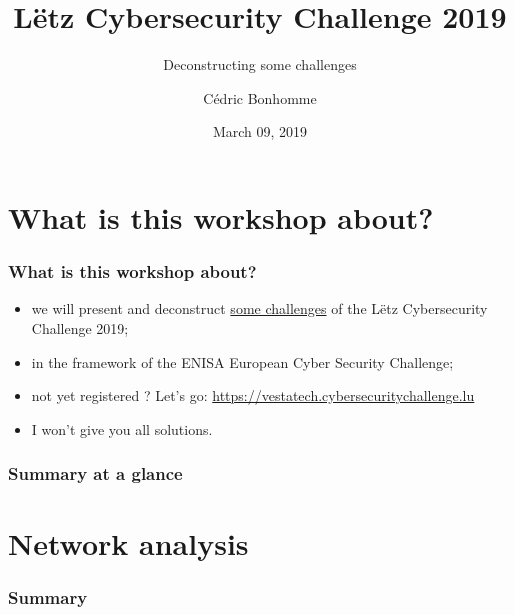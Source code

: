 \documentclass[]{beamer}
\title[Deconstructing some challenges from LCSC 2019]{Lëtz Cybersecurity Challenge 2019}
\subtitle{Deconstructing some challenges}
\author{C\'{e}dric Bonhomme}
\institute[CIRCL]{CIRCL - Security Made In Lëtzebuerg}
\date{March 09, 2019}
\begin{document}
\begin{frame}
    \titlepage
\end{frame}


%
%
\section*{What is this workshop about?}
\begin{frame}
    \frametitle{What is this workshop about?}
    \begin{center}
        \begin{itemize}
            \item we will present and deconstruct \href{https://github.com/cscluxembourg/vestatech}{some challenges} of the Lëtz Cybersecurity Challenge 2019;
            \item in the framework of the ENISA European Cyber Security Challenge;
            \item not yet registered ? Let's go: \href{https://vestatech.cybersecuritychallenge.lu}{https://vestatech.cybersecuritychallenge.lu}
            \item I won't give you all solutions.
        \end{itemize}
    \end{center}
\end{frame}


\setcounter{tocdepth}{1}
\begin{frame}
    \frametitle{Summary at a glance}
    \tableofcontents
\end{frame}
\setcounter{tocdepth}{4}



% 
%
\section{Network analysis}
\begin{frame}
    \frametitle{Summary}
    \begin{columns}[t]
        \begin{column}{5cm}
            \tableofcontents[sections={1-3}, currentsection, hideothersubsections]
        \end{column}
        \begin{column}{5cm}
            \tableofcontents[sections={4-5}, currentsection, hideothersubsections]
        \end{column}
    \end{columns}
\end{frame}
\end{document}
